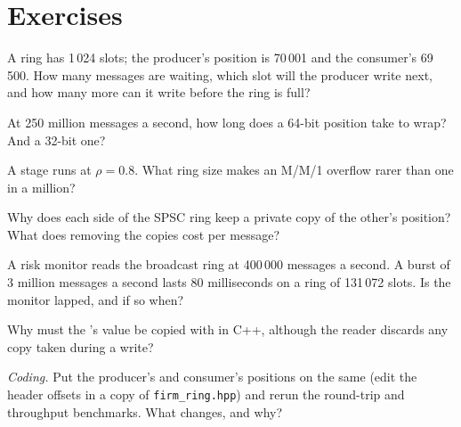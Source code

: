 \section{Exercises}

\begin{exercise}[$\star$]\label{exo:ll:queues-ring-buffers-and-shared-memory:1}
A ring has 1\,024 slots; the producer's position is 70\,001 and the consumer's 69\,500. How many messages are waiting, which slot
will the producer write next, and how many more can it write before the ring is full?
\end{exercise}

\begin{exercise}[$\star$]\label{exo:ll:queues-ring-buffers-and-shared-memory:2}
At 250 million messages a second, how long does a 64-bit position take to wrap? And a 32-bit one?
\end{exercise}

\begin{exercise}[$\star$]\label{exo:ll:queues-ring-buffers-and-shared-memory:3}
A stage runs at $\rho = 0.8$. What ring size makes an M/M/1 overflow rarer than one in a million?
\end{exercise}

\begin{exercise}[$\star\star$]\label{exo:ll:queues-ring-buffers-and-shared-memory:4}
Why does each side of the SPSC ring keep a private copy of the other's position? What does removing the copies cost per message?
\end{exercise}

\begin{exercise}[$\star\star$]\label{exo:ll:queues-ring-buffers-and-shared-memory:5}
A risk monitor reads the broadcast ring at 400\,000 messages a second. A burst of 3 million messages a second lasts 80
milliseconds on a ring of 131\,072 slots. Is the monitor lapped, and if so when?
\end{exercise}

\begin{exercise}[$\star\star$]\label{exo:ll:queues-ring-buffers-and-shared-memory:6}
Why must the 's value be copied with  in C++, although the reader discards any copy taken during a
write?
\end{exercise}

\begin{exercise}[$\star\star\star$]\label{exo:ll:queues-ring-buffers-and-shared-memory:7}
\emph{Coding.} Put the producer's and consumer's positions on the same  (edit the header offsets in a copy of
\texttt{firm\_ring.hpp}) and rerun the round-trip and throughput benchmarks. What changes, and why?
\end{exercise}

